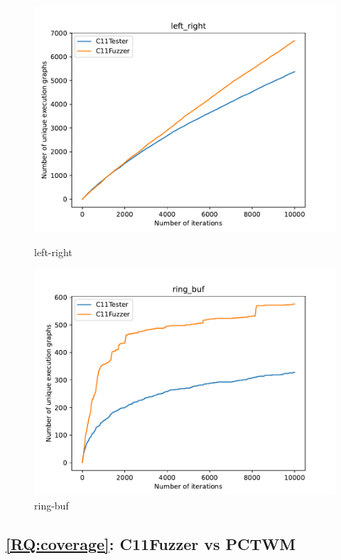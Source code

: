 \begin{figure}[H]
	\begin{minipage}{0.45\textwidth}
		\centering
		\includegraphics[width=\textwidth]{figure/left_right.pdf}
		\caption{left-right}
		\label{cover-plot1-left-right}
	\end{minipage}
	\hfill
	\begin{minipage}{0.45\textwidth}
		\centering
		\includegraphics[width=\textwidth]{figure/ring_buf.pdf}
		\caption{ring-buf}
		\label{cover-plot1-ring-buf}
	\end{minipage}

\end{figure}

\subsection{\ref*{RQ:coverage}: C11Fuzzer vs PCTWM}

